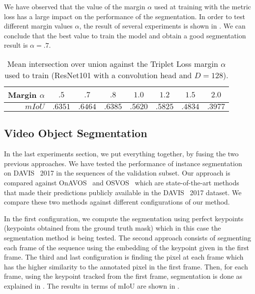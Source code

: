 We have observed that the value of the margin $\alpha$ used at training with the metric loss has a large impact on the performance of the segmentation.
In order to test different margin values $\alpha$, the result of several experiments is shown in .
We can conclude that the best value to train the model and obtain a good segmentation result is $\alpha = .7$.

\begin{table}[h]
  \centering
  \begin{tabular}{r|ccccccc}
    \toprule
    Margin $\alpha$ & $.5$    & $\mathbf{.7}$    & $.8$    & $1.0$   & $1.2$   & $1.5$   & $2.0$   \\
    \midrule
    $mIoU$          & $.6351$ & $\mathbf{.6464}$ & $.6385$ & $.5620$ & $.5825$ & $.4834$ & $.3977$ \\
    \bottomrule
  \end{tabular}
  \caption{Mean intersection over union against the Triplet Loss margin $\alpha$ used to train (ResNet101 with a convolution head and $D=128$). }
  \label{tab:experiments:segmentation:marginmiou}
\end{table}


\subsection{Video Object Segmentation}

In the last experiments section, we put everything together, by fusing the two previous approaches.
We have tested the performance of instance segmentation on DAVIS~\davislast{} 2017 in the sequences of the validation subset.
Our approach is compared against OnAVOS~\onavos{} and OSVOS~\osvos{} which are state-of-the-art methods that made their predictions publicly available in the DAVIS~\davislast{} 2017 dataset. We compare these two methods against different configurations of our method.

In the first configuration, we compute the segmentation using perfect keypoints (keypoints obtained from the ground truth mask) which in this case the segmentation method is being tested.
The second approach consists of segmenting each frame of the sequence using the embedding of the keypoint given in the first frame.
The third and last configuration is finding the pixel at each frame which has the higher similarity to the annotated pixel in the first frame.
Then, for each frame, using the keypoint tracked from the first frame, segmentation is done as explained in .
The results in terms of mIoU are shown in .


